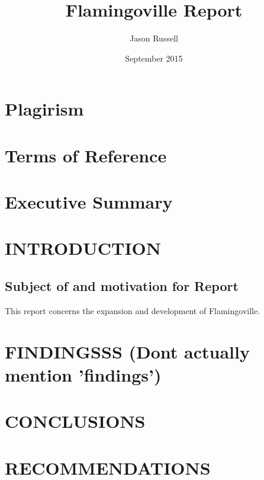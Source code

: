\documentclass{article}
\title{Flamingoville Report}
\date{September 2015}
\author{Jason Russell}
\begin{document}
\maketitle
\thispagestyle{empty}

\setcounter{page}{0}

\newpage
\section*{Plagirism}

\newpage
\section*{Terms of Reference}

\newpage
\section*{Executive Summary}

\newpage
\tableofcontents

\setcounter{page}{0}

\newpage
\section{INTRODUCTION}
\subsection{Subject of and motivation for Report}
This report concerns the expansion and development of Flamingoville.

\newpage
\section{FINDINGSSS (Dont actually mention 'findings')}

\newpage
\section{CONCLUSIONS}

\newpage
\section{RECOMMENDATIONS}

\newpage
\printbibliography
\end{document}
